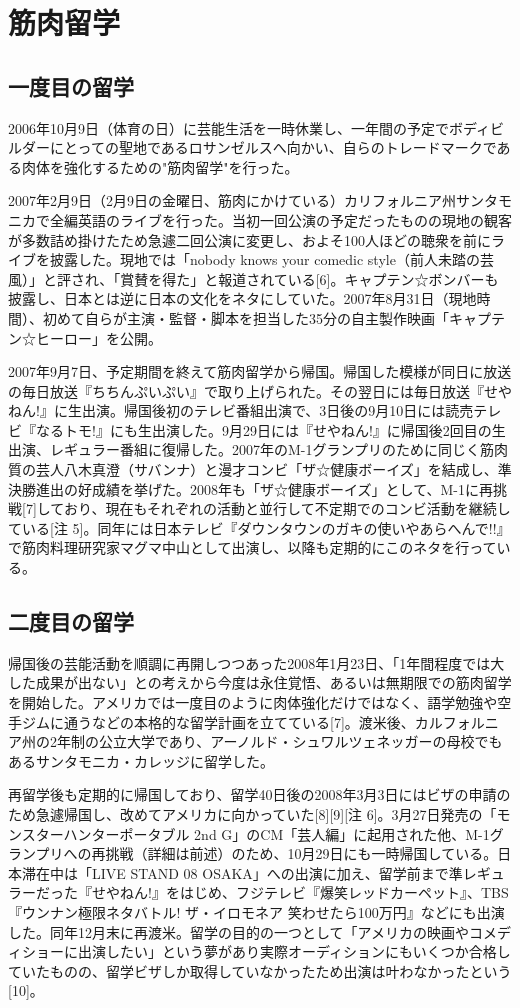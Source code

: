 \section{筋肉留学}
\subsection{一度目の留学}
2006年10月9日（体育の日）に芸能生活を一時休業し、一年間の予定でボディビルダーにとっての聖地であるロサンゼルスへ向かい、自らのトレードマークである肉体を強化するための"筋肉留学"を行った。

2007年2月9日（2月9日の金曜日、筋肉にかけている）カリフォルニア州サンタモニカで全編英語のライブを行った。当初一回公演の予定だったものの現地の観客が多数詰め掛けたため急遽二回公演に変更し、およそ100人ほどの聴衆を前にライブを披露した。現地では「nobody knows your comedic style（前人未踏の芸風）」と評され、「賞賛を得た」と報道されている[6]。キャプテン☆ボンバーも披露し、日本とは逆に日本の文化をネタにしていた。2007年8月31日（現地時間）、初めて自らが主演・監督・脚本を担当した35分の自主製作映画「キャプテン☆ヒーロー」を公開。

2007年9月7日、予定期間を終えて筋肉留学から帰国。帰国した模様が同日に放送の毎日放送『ちちんぷいぷい』で取り上げられた。その翌日には毎日放送『せやねん!』に生出演。帰国後初のテレビ番組出演で、3日後の9月10日には読売テレビ『なるトモ!』にも生出演した。9月29日には『せやねん!』に帰国後2回目の生出演、レギュラー番組に復帰した。2007年のM-1グランプリのために同じく筋肉質の芸人八木真澄（サバンナ）と漫才コンビ「ザ☆健康ボーイズ」を結成し、準決勝進出の好成績を挙げた。2008年も「ザ☆健康ボーイズ」として、M-1に再挑戦[7]しており、現在もそれぞれの活動と並行して不定期でのコンビ活動を継続している[注 5]。同年には日本テレビ『ダウンタウンのガキの使いやあらへんで!!』で筋肉料理研究家マグマ中山として出演し、以降も定期的にこのネタを行っている。
\subsection{二度目の留学}
帰国後の芸能活動を順調に再開しつつあった2008年1月23日、「1年間程度では大した成果が出ない」との考えから今度は永住覚悟、あるいは無期限での筋肉留学を開始した。アメリカでは一度目のように肉体強化だけではなく、語学勉強や空手ジムに通うなどの本格的な留学計画を立てている[7]。渡米後、カルフォルニア州の2年制の公立大学であり、アーノルド・シュワルツェネッガーの母校でもあるサンタモニカ・カレッジに留学した。

再留学後も定期的に帰国しており、留学40日後の2008年3月3日にはビザの申請のため急遽帰国し、改めてアメリカに向かっていた[8][9][注 6]。3月27日発売の「モンスターハンターポータブル 2nd G」のCM「芸人編」に起用された他、M-1グランプリへの再挑戦（詳細は前述）のため、10月29日にも一時帰国している。日本滞在中は「LIVE STAND 08 OSAKA」への出演に加え、留学前まで準レギュラーだった『せやねん!』をはじめ、フジテレビ『爆笑レッドカーペット』、TBS『ウンナン極限ネタバトル! ザ・イロモネア 笑わせたら100万円』などにも出演した。同年12月末に再渡米。留学の目的の一つとして「アメリカの映画やコメディショーに出演したい」という夢があり実際オーディションにもいくつか合格していたものの、留学ビザしか取得していなかったため出演は叶わなかったという[10]。

